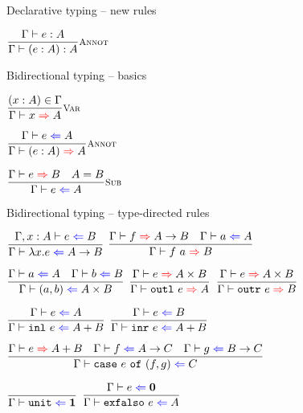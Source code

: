 \documentclass{beamer}
\newcommand{\Fun}[2]{#1 \to #2}
\newcommand{\Prod}[2]{#1 \times #2}
\newcommand{\Sum}[2]{#1 + #2}
\newcommand{\Unit}{\textbf{1}}
\newcommand{\Empty}{\textbf{0}}
\newcommand{\annot}[2]{(#1 : #2)}
\newcommand{\fun}[2]{\lambda #1. #2}
\newcommand{\app}[2]{#1\ #2}
\newcommand{\pair}[2]{(#1, #2)}
\newcommand{\outl}[1][]{\texttt{outl}\ #1}
\newcommand{\outr}[1][]{\texttt{outr}\ #1}
\newcommand{\inl}[1][]{\texttt{inl}\ #1}
\newcommand{\inr}[1][]{\texttt{inr}\ #1}
\newcommand{\case}[3]{\texttt{case}\ #1\ \texttt{of}\ (#2, #3)}
\newcommand{\unit}{\texttt{unit}}
\newcommand{\exfalso}[1][]{\texttt{exfalso}\ #1}
\newcommand{\fulltyping}[3]{#1 \vdash #2 : #3}
\newcommand{\typing}[2]{\fulltyping{\Gamma}{#1}{#2}}
\newcommand{\infrule}[3][]{\displaystyle \frac{#2}{#3} \textsc{\footnotesize{#1}}}
\newcommand{\extend}[3]{#1, #2 : #3}
\newcommand{\sidecond}[1]{#1}
\begin{document}
\begin{frame}{Declarative typing -- new rules}

\begin{center}
  $\infrule[Annot]{\typing{e}{A}}{\typing{\annot{e}{A}}{A}}$
\end{center}

\end{frame}

\newcommand{\fullcheck}[3]{#1 \vdash #2 \mathcolor{blue}{\Leftarrow} #3}
\renewcommand{\check}[2]{\fullcheck{\Gamma}{#1}{#2}}

\newcommand{\fullinfer}[3]{#1 \vdash #2 \mathcolor{red}{\Rightarrow} #3}
\newcommand{\infer}[2]{\fullinfer{\Gamma}{#1}{#2}}

\begin{frame}{Bidirectional typing -- basics}

\begin{center}
  $\infrule[Var]{\sidecond{(x : A) \in \Gamma}}{\infer{x}{A}}$

  \vspace{2em}

  $\infrule[Annot]{\check{e}{A}}{\infer{\annot{e}{A}}{A}}$

  \vspace{2em}

  $\infrule[Sub]{\infer{e}{B} \quad \sidecond{A = B}}{\check{e}{A}}$
\end{center}

\end{frame}

\begin{frame}{Bidirectional typing -- type-directed rules}

\begin{center}
  $\infrule{\fullcheck{\extend{\Gamma}{x}{A}}{e}{B}}{\check{\fun{x}{e}}{\Fun{A}{B}}}$ \quad
  $\infrule{\infer{f}{\Fun{A}{B}} \quad \check{a}{A}}{\infer{\app{f}{a}}{B}}$

  \vspace{2em}

  $\infrule{\check{a}{A} \quad \check{b}{B}}{\check{\pair{a}{b}}{\Prod{A}{B}}}$ \quad
  $\infrule{\infer{e}{\Prod{A}{B}}}{\infer{\outl[e]}{A}}$ \quad
  $\infrule{\infer{e}{\Prod{A}{B}}}{\infer{\outr[e]}{B}}$

  \vspace{2em}

  $\infrule{\check{e}{A}}{\check{\inl[e]}{\Sum{A}{B}}}$ \quad
  $\infrule{\check{e}{B}}{\check{\inr[e]}{\Sum{A}{B}}}$

  \vspace{2em}

  $\infrule{\infer{e}{\Sum{A}{B}} \quad \check{f}{\Fun{A}{C}} \quad \check{g}{\Fun{B}{C}}}{\check{\case{e}{f}{g}}{C}}$

  \vspace{2em}

  $\infrule{}{\check{\unit}{\Unit}}$ \quad
  $\infrule{\check{e}{\Empty}}{\check{\exfalso[e]}{A}}$
\end{center}

\end{frame}
\end{document}
